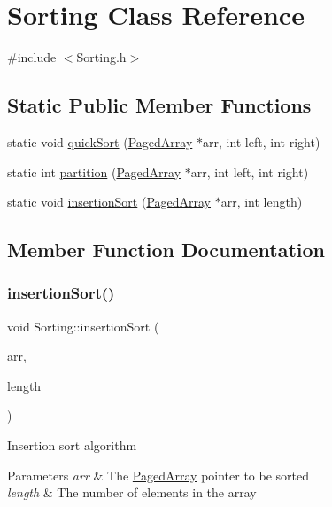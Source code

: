 \hypertarget{classSorting}{}\section{Sorting Class Reference}
\label{classSorting}


{\ttfamily \#include $<$Sorting.\+h$>$}

\subsection*{Static Public Member Functions}
\begin{DoxyCompactItemize}
\item 
static void \mbox{\hyperlink{classSorting_ae95d664f39b100ad4eb5eec8955382f0}{quick\+Sort}} (\mbox{\hyperlink{classPagedArray}{Paged\+Array}} $\ast$arr, int left, int right)
\item 
static int \mbox{\hyperlink{classSorting_a425db91d5466d143705a14a6cbb04c20}{partition}} (\mbox{\hyperlink{classPagedArray}{Paged\+Array}} $\ast$arr, int left, int right)
\item 
static void \mbox{\hyperlink{classSorting_ab141cec11908bd6c70f5da777187a9f1}{insertion\+Sort}} (\mbox{\hyperlink{classPagedArray}{Paged\+Array}} $\ast$arr, int length)
\end{DoxyCompactItemize}


\subsection{Member Function Documentation}
\mbox{\label{classSorting_ab141cec11908bd6c70f5da777187a9f1}} 
\subsubsection{\texorpdfstring{insertion\+Sort()}{insertionSort()}}
{\footnotesize\ttfamily void Sorting\+::insertion\+Sort (\begin{DoxyParamCaption}\item[{\mbox{\hyperlink{classPagedArray}{Paged\+Array}} $\ast$}]{arr,  }\item[{int}]{length }\end{DoxyParamCaption})\hspace{0.3cm}{\ttfamily [static]}}

Insertion sort algorithm 
\begin{DoxyParams}{Parameters}
{\em arr} & The \mbox{\hyperlink{classPagedArray}{Paged\+Array}} pointer to be sorted \\
\hline
{\em length} & The number of elements in the array \\
\hline
\end{DoxyParams}
\mbox{\label{classSorting_a425db91d5466d143705a14a6cbb04c20}} 
